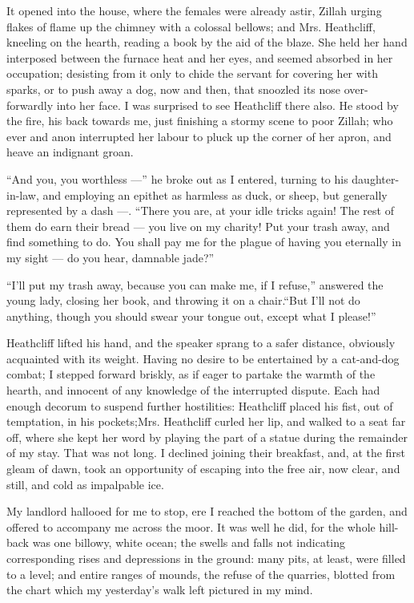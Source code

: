 \par It opened into the house, where the females were already astir, Zillah urging flakes of flame up the chimney with a colossal bellows; and Mrs. Heathcliff, kneeling on the hearth, reading a book by the aid of the blaze. She held her hand interposed between the furnace heat and her eyes, and seemed absorbed in her occupation; desisting from it only to chide the servant for covering her with sparks, or to push away a dog, now and then, that snoozled its nose over-forwardly into her face. I was surprised to see Heathcliff there also. He stood by the fire, his back towards me, just finishing a stormy scene to poor Zillah; who ever and anon interrupted her labour to pluck up the corner of her apron, and heave an indignant groan.
\par “And you, you worthless —” he broke out as I entered, turning to his daughter-in-law, and employing an epithet as harmless as duck, or sheep, but generally represented by a dash —. “There you are, at your idle tricks again! The rest of them do earn their bread — you live on my charity! Put your trash away, and find something to do. You shall pay me for the plague of having you eternally in my sight — do you hear, damnable jade?”
\par “I'll put my trash away, because you can make me, if I refuse,” answered the young lady, closing her book, and throwing it on a chair.“But I'll not do anything, though you should swear your tongue out, except what I please!”
\par Heathcliff lifted his hand, and the speaker sprang to a safer distance, obviously acquainted with its weight. Having no desire to be entertained by a cat-and-dog combat; I stepped forward briskly, as if eager to partake the warmth of the hearth, and innocent of any knowledge of the interrupted dispute. Each had enough decorum to suspend further hostilities: Heathcliff placed his fist, out of temptation, in his pockets;Mrs. Heathcliff curled her lip, and walked to a seat far off, where she kept her word by playing the part of a statue during the remainder of my stay. That was not long. I declined joining their breakfast, and, at the first gleam of dawn, took an opportunity of escaping into the free air, now clear, and still, and cold as impalpable ice.
\par My landlord hallooed for me to stop, ere I reached the bottom of the garden, and offered to accompany me across the moor. It was well he did, for the whole hill-back was one billowy, white ocean; the swells and falls not indicating corresponding rises and depressions in the ground: many pits, at least, were filled to a level; and entire ranges of mounds, the refuse of the quarries, blotted from the chart which my yesterday's walk left pictured in my mind.
